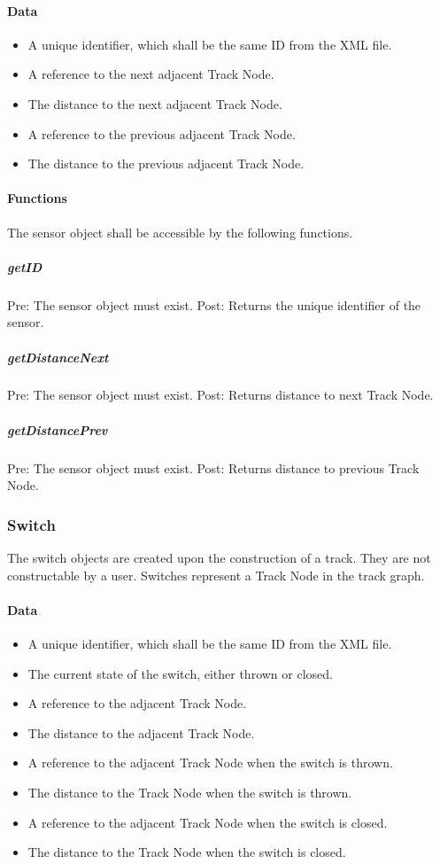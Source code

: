 \documentclass[a4paper,11pt,notitlepage]{article}
\def\TN{Track Node\xspace}
\begin{document}
\paragraph{Data}
\begin{itemize}
\item A unique identifier, which shall be the same ID from the XML file.
\item A reference to the next adjacent \TN.
\item The distance to the next adjacent \TN.
\item A reference to the previous adjacent \TN.
\item The distance to the previous adjacent \TN.
\end{itemize}
\paragraph{Functions}
The sensor object shall be accessible by the following functions.
\subparagraph{getID} Pre: The sensor object must exist. Post: Returns the unique identifier of the sensor.
\subparagraph{getDistanceNext} Pre: The sensor object must exist. Post: Returns distance to next \TN.
\subparagraph{getDistancePrev} Pre: The sensor object must exist. Post: Returns distance to previous \TN.

\subsubsection{Switch}
The switch objects are created upon the construction of a track. They are not constructable by a user. Switches represent a \TN in the track graph.
\paragraph{Data}
\begin{itemize}
\item A unique identifier, which shall be the same ID from the XML file.
\item The current state of the switch, either thrown or closed.
\item A reference to the adjacent \TN.
\item The distance to the adjacent \TN.
\item A reference to the adjacent \TN when the switch is thrown.
\item The distance to the \TN when the switch is thrown.
\item A reference to the adjacent \TN when the switch is closed.
\item The distance to the \TN when the switch is closed.
\end{itemize}
\end{document}
